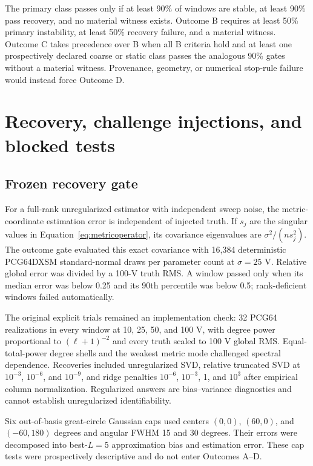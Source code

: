 \documentclass[11pt]{article}
\begin{document}
The primary class passes only if at least 90\% of windows are stable, at least
90\% pass recovery, and no material witness exists.  Outcome B requires at
least 50\% primary instability, at least 50\% recovery failure, and a material
witness.  Outcome C takes precedence over B when all B criteria hold and at
least one prospectively declared coarse or static class passes the analogous
90\% gates without a material witness.  Provenance, geometry, or numerical
stop-rule failure would instead force Outcome D.

\section{Recovery, challenge injections, and blocked tests}

\subsection{Frozen recovery gate}

For a full-rank unregularized estimator with independent sweep noise, the
metric-coordinate estimation error is independent of injected truth.  If
$s_j$ are the singular values in Equation~\eqref{eq:metricoperator}, its
covariance eigenvalues are $\sigma^2/(n s_j^2)$.  The outcome gate evaluated
this exact covariance with 16,384 deterministic PCG64DXSM standard-normal
draws per parameter count at $\sigma=25$ V.  Relative global error was divided
by a 100-V truth RMS.  A window passed only when its median error was below
0.25 and its 90th percentile was below 0.5; rank-deficient windows failed
automatically.

The original explicit trials remained an implementation check: 32 PCG64
realizations in every window at 10, 25, 50, and 100 V, with degree power
proportional to $(\ell+1)^{-2}$ and every truth scaled to 100 V global RMS.
Equal-total-power degree shells and the weakest metric mode challenged spectral
dependence.  Recoveries included unregularized SVD, relative truncated SVD at
$10^{-3}$, $10^{-6}$, and $10^{-9}$, and ridge penalties $10^{-6}$,
$10^{-3}$, 1, and $10^3$ after empirical column normalization.  Regularized
answers are bias--variance diagnostics and cannot establish unregularized
identifiability.

Six out-of-basis great-circle Gaussian caps used centers $(0,0)$, $(60,0)$,
and $(-60,180)$ degrees and angular FWHM 15 and 30 degrees.  Their errors were
decomposed into best-$L=5$ approximation bias and estimation error.  These cap
tests were prospectively descriptive and do not enter Outcomes A--D.
\end{document}

